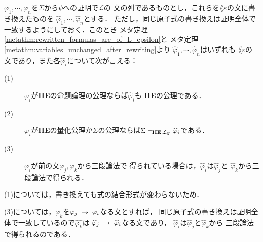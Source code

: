 	\begin{metaprf}
		$\varphi_{1},\cdots,\varphi_{n}$を$\Sigma$から$\psi$への証明で$\mathcal{L}$の
		文の列であるものとし，これらを$\lang{\varepsilon}$の文に書き換えたものを
		$\widehat{\varphi}_{1},\cdots,\widehat{\varphi}_{n}$とする．
		ただし，同じ原子式の書き換えは証明全体で一致するようにしておく．このとき
		メタ定理\ref{metathm:rewritten_formulas_are_of_L_epsilon}と
		メタ定理\ref{metathm:variables_unchanged_after_rewriting}より
		$\widehat{\varphi}_{1},\cdots,\widehat{\varphi}_{n}$はいずれも
		$\lang{\varepsilon}$の文であり，また各$\widehat{\varphi}_{i}$について次が言える：
		\begin{description}
			\item[(1)] $\varphi_{i}$が{\bf HE}の命題論理の公理ならば$\widehat{\varphi}_{i}$も
				{\bf HE}の公理である．
				
			\item[(2)] $\varphi_{i}$が{\bf HE}の量化公理か$\Sigma$の公理ならば$\Sigma 
				\provable{\mbox{{\bf HE}},\lang{\varepsilon}} \widehat{\varphi}_{i}$である．
				
			\item[(3)] $\varphi_{i}$が前の文$\varphi_{j},\varphi_{k}$から三段論法で
				得られている場合は，$\widehat{\varphi}_{i}$は$\widehat{\varphi}_{j}$と
				$\widehat{\varphi}_{k}$から三段論法で得られる．
		\end{description}
		
		(1)については，書き換えても式の結合形式が変わらないため．
		
		(3)については，$\varphi_{k}$を$\varphi_{j} \hspace{0.25em}\rightarrow\hspace{0.25em} \varphi_{i}$なる文とすれば，
		同じ原子式の書き換えは証明全体で一致しているので$\widehat{\varphi_{k}}$は
		$\widehat{\varphi}_{j} \hspace{0.25em}\rightarrow\hspace{0.25em} \widehat{\varphi}_{i}$なる文であり，
		$\widehat{\varphi}_{i}$は$\widehat{\varphi}_{j}$と$\widehat{\varphi}_{k}$から
		三段論法で得られるのである．
		

\end{metaprf}
